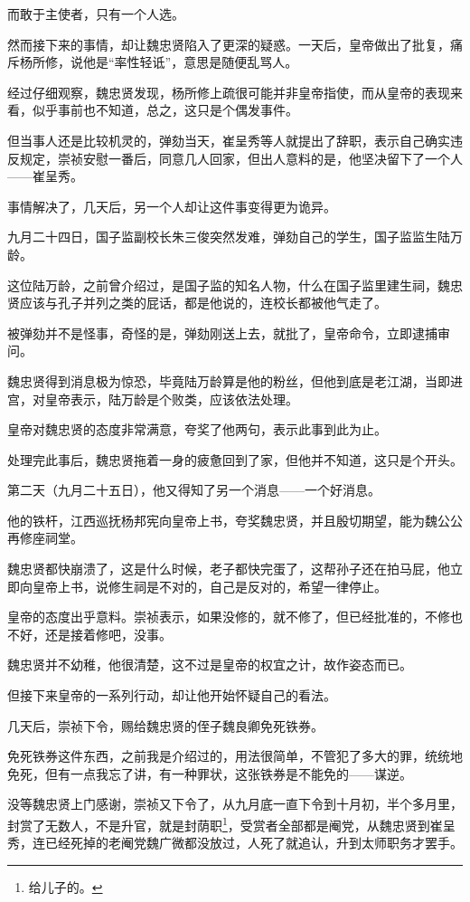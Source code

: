 \begin{multicols}{\theparacolNo}
而敢于主使者，只有一个人选。

然而接下来的事情，却让魏忠贤陷入了更深的疑惑。一天后，皇帝做出了批复，痛斥杨所修，说他是“率性轻诋”，意思是随便乱骂人。

经过仔细观察，魏忠贤发现，杨所修上疏很可能并非皇帝指使，而从皇帝的表现来看，似乎事前也不知道，总之，这只是个偶发事件。

但当事人还是比较机灵的，弹劾当天，崔呈秀等人就提出了辞职，表示自己确实违反规定，崇祯安慰一番后，同意几人回家，但出人意料的是，他坚决留下了一个人——崔呈秀。

事情解决了，几天后，另一个人却让这件事变得更为诡异。

九月二十四日，国子监副校长朱三俊突然发难，弹劾自己的学生，国子监监生陆万龄。

这位陆万龄，之前曾介绍过，是国子监的知名人物，什么在国子监里建生祠，魏忠贤应该与孔子并列之类的屁话，都是他说的，连校长都被他气走了。

被弹劾并不是怪事，奇怪的是，弹劾刚送上去，就批了，皇帝命令，立即逮捕审问。

魏忠贤得到消息极为惊恐，毕竟陆万龄算是他的粉丝，但他到底是老江湖，当即进宫，对皇帝表示，陆万龄是个败类，应该依法处理。

皇帝对魏忠贤的态度非常满意，夸奖了他两句，表示此事到此为止。

处理完此事后，魏忠贤拖着一身的疲惫回到了家，但他并不知道，这只是个开头。

第二天（九月二十五日），他又得知了另一个消息——一个好消息。

他的铁杆，江西巡抚杨邦宪向皇帝上书，夸奖魏忠贤，并且殷切期望，能为魏公公再修座祠堂。

魏忠贤都快崩溃了，这是什么时候，老子都快完蛋了，这帮孙子还在拍马屁，他立即向皇帝上书，说修生祠是不对的，自己是反对的，希望一律停止。

皇帝的态度出乎意料。崇祯表示，如果没修的，就不修了，但已经批准的，不修也不好，还是接着修吧，没事。

魏忠贤并不幼稚，他很清楚，这不过是皇帝的权宜之计，故作姿态而已。

但接下来皇帝的一系列行动，却让他开始怀疑自己的看法。

几天后，崇祯下令，赐给魏忠贤的侄子魏良卿免死铁券。

免死铁券这件东西，之前我是介绍过的，用法很简单，不管犯了多大的罪，统统地免死，但有一点我忘了讲，有一种罪状，这张铁券是不能免的——谋逆。

没等魏忠贤上门感谢，崇祯又下令了，从九月底一直下令到十月初，半个多月里，封赏了无数人，不是升官，就是封荫职\footnote{给儿子的。}，受赏者全部都是阉党，从魏忠贤到崔呈秀，连已经死掉的老阉党魏广微都没放过，人死了就追认，升到太师职务才罢手。


\end{multicols}

